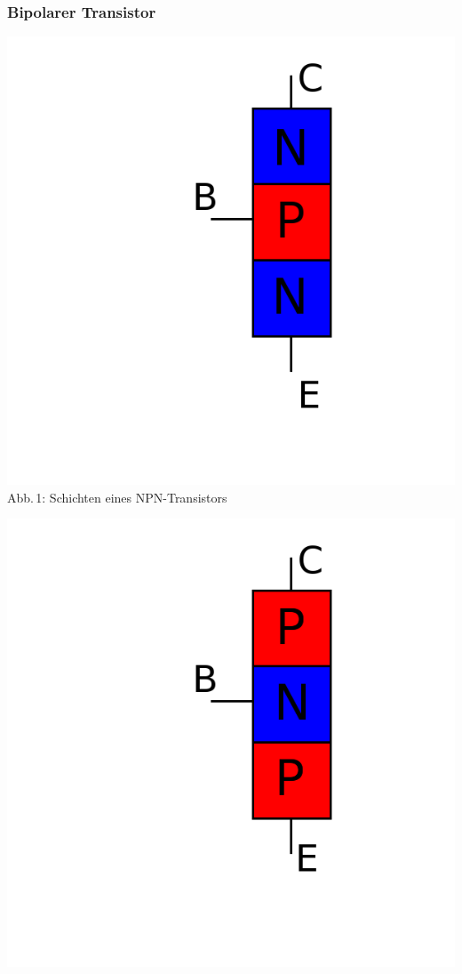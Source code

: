 \begin{frame}
  \frametitle{Bipolarer Transistor}
  \begin{minipage}{0.4\textwidth}
    \includegraphics[width=\textwidth,height=.5\textheight,keepaspectratio]{a06/NPN_hlb.png}\\
    {\tiny Abb.\,1: Schichten eines NPN-Transistors}
  \end{minipage}
  \hspace{0.5cm}
  \begin{minipage}{0.4\textwidth}
    \includegraphics[width=\textwidth,height=.5\textheight,keepaspectratio]{a06/PNP_hlb.png}\\

\end{minipage}
\end{frame}

